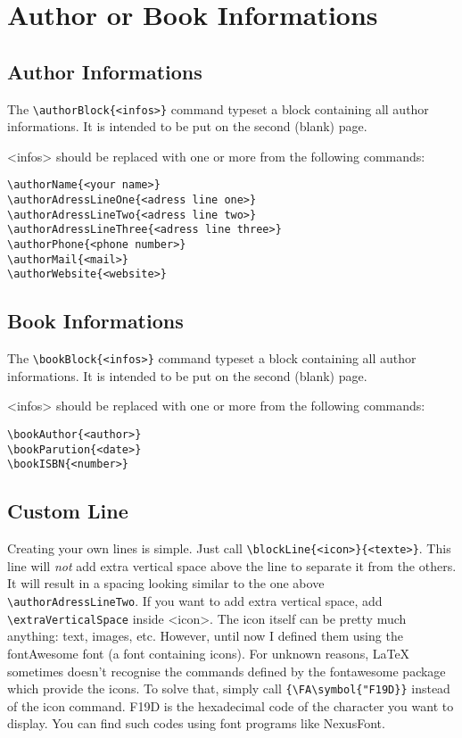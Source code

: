 \documentclass[a4paper, 11pt, oneside, fleqn]{article}
\begin{document}
	\section{Author or Book Informations}
	\subsection{Author Informations}
	The \lstinline[breaklines]|\authorBlock{<infos>}| command typeset a block containing all author informations. It is intended to be put on the second (blank) page.
	
	<infos> should be replaced with one or more from the following commands:
	\begin{lstlisting}[breaklines]
\authorName{<your name>}
\authorAdressLineOne{<adress line one>}
\authorAdressLineTwo{<adress line two>}
\authorAdressLineThree{<adress line three>}
\authorPhone{<phone number>}
\authorMail{<mail>}
\authorWebsite{<website>}
	\end{lstlisting}
	
	\subsection{Book Informations}
	The \lstinline[breaklines]|\bookBlock{<infos>}| command typeset a block containing all author informations. It is intended to be put on the second (blank) page.
	
	<infos> should be replaced with one or more from the following commands:
	\begin{lstlisting}[breaklines]
\bookAuthor{<author>}
\bookParution{<date>}
\bookISBN{<number>}
	\end{lstlisting}
	
	\subsection{Custom Line}
	Creating your own lines is simple. Just call \lstinline[breaklines]|\blockLine{<icon>}{<texte>}|. This line will \textit{not} add extra vertical space above the line to separate it from the others. It will result in a spacing looking similar to the one above \lstinline|\authorAdressLineTwo|. If you want to add extra vertical space, add \lstinline|\extraVerticalSpace| inside <icon>. The icon itself can be pretty much anything: text, images, etc. However, until now I defined them using the fontAwesome font (a font containing icons). For unknown reasons, LaTeX sometimes doesn't recognise the commands defined by the fontawesome package which provide the icons. To solve that, simply call \lstinline[breaklines]|{\FA\symbol{"F19D}}| instead of the icon command. F19D is the hexadecimal code of the character you want to display. You can find such codes using font programs like NexusFont.
	
\end{document}

